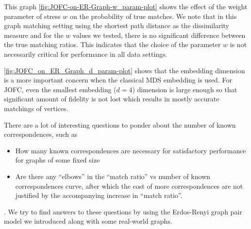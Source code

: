 \documentclass[12pt,oneside,final]{thesis}\usepackage[]{graphicx}\usepackage[]{color}
\begin{document}
This graph \ref{fig:JOFC-on-ER-Graph-w_param-plot} shows the effect of the weight parameter of stress $w$ on the probability of true matches. We note that in this graph matching setting using the shortest path distance as the dissimilarity measure and for the $w$ values we tested, there is no significant difference between the true matching ratios. This indicates that the choice of the parameter $w$ is not necessarily critical for performance in all data settings. 









\autoref{fig:JOFC_on_ER_Graph_d_param-plot} shows that the embedding dimension is a more important concern when the classical MDS embedding is used. For JOFC, even the smallest embedding ($d=4$) dimension is large enough so that significant amount of fidelity  is not  lost which results in mostly accurate matchings of vertices.



There are a lot  of interesting questions to ponder about the number of known correspondences, such as 
\begin{itemize}
\item How many known correspondences are necessary for satisfactory performance for graphs of some fixed size 
\item Are there  any ``elbows'' in the ``match ratio'' vs number of known correspondences curve,  after which the cost of more correspondences are not justified by the accompanying increase in ``match ratio''.
\end{itemize}.
We try to find answers to these questions by using the Erdos-Renyi graph pair model we introduced along with some real-world graphs.
\end{document}
